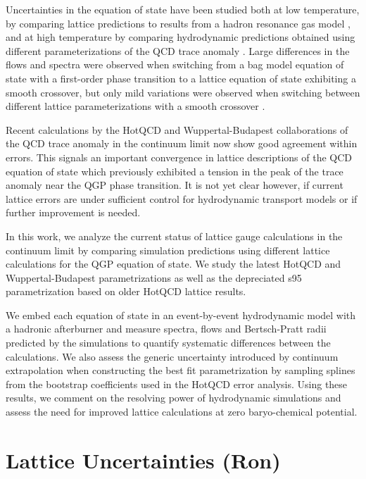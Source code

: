 \documentclass[aps,prc,reprint,amsmath,nofootinbib,superscriptaddress]{revtex4-1}
\begin{document}
Uncertainties in the equation of state have been studied both at low temperature, by comparing lattice predictions to results from a hadron resonance gas model
\cite{Huovinen:2009yb}, and at high temperature by comparing hydrodynamic predictions obtained using different parameterizations of the QCD trace anomaly 
\cite{Huovinen:2005gy, Huovinen:2009yb}. Large differences in the flows and spectra were observed when switching from a bag model equation of state with a first-order 
phase transition to a lattice equation of state exhibiting a smooth crossover, but only mild variations were observed when switching between different lattice 
parameterizations with a smooth crossover \cite{Huovinen:2009yb}.

Recent calculations by the HotQCD and Wuppertal-Budapest collaborations of the QCD trace anomaly in the continuum limit now show good agreement within errors. This signals an important
convergence in lattice descriptions of the QCD equation of state which previously exhibited a tension in the peak of the trace anomaly near the QGP phase transition. It is not yet clear however, if current
lattice errors are under sufficient control for hydrodynamic transport models or if further improvement is needed.  

In this work, we analyze the current status of lattice gauge calculations in the continuum limit by comparing simulation predictions using different lattice calculations for the QGP equation of state.
We study the latest HotQCD and Wuppertal-Budapest parametrizations as well as the depreciated s95 parametrization based on older HotQCD lattice results. 

We embed each equation of state in an event-by-event hydrodynamic model with a hadronic afterburner and measure spectra, flows and Bertsch-Pratt radii predicted by the simulations to quantify systematic 
differences between the calculations. We also assess the generic uncertainty introduced by continuum extrapolation when constructing the best fit parametrization by sampling splines from the bootstrap coefficients 
used in the HotQCD error analysis. Using these results, we comment on the resolving power of hydrodynamic simulations and assess the need for improved lattice calculations at zero baryo-chemical potential.




\section{Lattice Uncertainties (Ron)}
\end{document}
